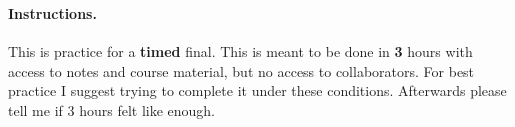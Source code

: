 \documentclass[12pt]{article}
\begin{document}

 \\
~\\

\paragraph{Instructions.} This is practice for a {\bf timed} final. This is meant to be done in \textbf{3} hours with access to notes and course material, but no access to collaborators. For best practice I suggest trying to complete it under these conditions. Afterwards please tell me if 3 hours felt like enough.
 \vspace*{0.1in}


\end{document}
